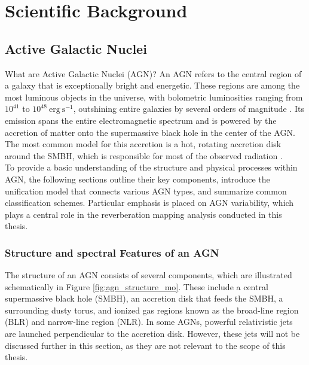 \chapter{Scientific Background}
\label{chap:scientific_background}

\section{Active Galactic Nuclei}
\label{sec:agn}

What are Active Galactic Nuclei (AGN)? An AGN refers to the central region of a galaxy that is exceptionally bright and energetic. These regions are among the most luminous objects in the universe, with bolometric luminosities ranging from $10^{41}$ to $10^{48} \ \mathrm{erg \ s^{-1}}$, outshining entire galaxies by several orders of magnitude \parencite{peterson1997introduction}.
Its emission spans the entire electromagnetic spectrum and is powered by the accretion of matter onto the supermassive black hole in the center of the AGN. The most common model for this accretion is a hot, rotating accretion disk around the SMBH, which is responsible for most of the observed radiation \parencite{shakura1973black}.\\
To provide a basic understanding of the structure and physical processes within AGN, the following sections outline their key components, introduce the unification model that connects various AGN types, and summarize common classification schemes. Particular emphasis is placed on AGN variability, which plays a central role in the reverberation mapping analysis conducted in this thesis.


\subsection{Structure and spectral Features of an AGN}
\label{sec:agn_structure}

The structure of an AGN consists of several components, which are illustrated schematically in Figure \ref{fig:agn_structure_mo}. These include a central supermassive black hole (SMBH), an accretion disk that feeds the SMBH, a surrounding dusty torus, and ionized gas regions known as the broad-line region (BLR) and narrow-line region (NLR). In some AGNs, powerful relativistic jets are launched perpendicular to the accretion disk. However, these jets will not be discussed further in this section, as they are not relevant to the scope of this thesis. 

